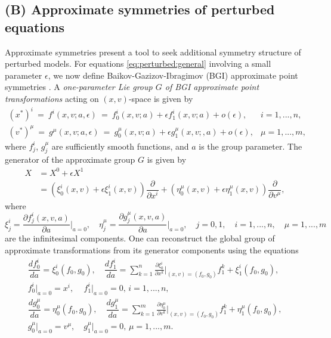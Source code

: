 \documentclass[11pt,letter,subeqn]{article}
\def\beq{\begin{equation}}
\def\eeq{\end{equation}}
\def\barr{\begin{array}{ll}}
\def\earr{\end{array}}
\begin{document}
\subsection*{\textbf{(B)} Approximate symmetries of perturbed equations}
Approximate symmetries present a tool to seek additional symmetry structure of perturbed models. For equations \eqref{eq:perturbed:general} involving a small parameter $\epsilon$, we now define Baikov-Gazizov-Ibragimov (BGI) approximate point symmetries \cite{ibragimov1995crc,ibragimov2009approximate}. A \textit{one-parameter Lie group $G$ of BGI approximate point transformations} acting on $(x,v)$-space is given by
\begin{equation}\label{approx}
\begin{array}{ll}
     {(x^*)}^{i} ~=~ f^i(x,v;a,\epsilon) ~=~ f_0^i(x,v;a)+\epsilon f_1^i(x,v;a) + o(\epsilon),&  i=1,...,n, \\[1ex]
     {(v^*)}^{\mu}~ =~g^\mu(x,v;a,\epsilon)~=~ g_0^\mu(x,v;a)+\epsilon g_1^\mu(x,v;,a) + o(\epsilon),&  \mu=1,...,m,
\earr
\end{equation}
where $f_j^i$, $g_j^\mu$ are sufficiently smooth functions, and $a$ is the group parameter. The generator of the approximate group $G$ is given by
\beq\label{X:X0:X1}
\barr
X &= X^0+\epsilon X^1 \\[2ex]
  &= \left(\xi_0^i(x,v)+\epsilon \xi_1^i(x,v)\right)\dfrac{\partial}{\partial x^i}+\left(\eta_0^\mu(x,v)+\epsilon \eta_1^\mu(x,v)\right)\dfrac{\partial}{\partial v^\mu},
\earr
\eeq
where
\[
\xi_j^i=\frac{\partial f_j^i(x,v,a) }{\partial a}\bigg|_{a=0},\quad \eta_j^\mu=\frac{\partial g_j^\mu(x,v,a) }{\partial a}\bigg|_{a=0},\quad  j=0,1,\quad i=1,...,n,\quad
\mu=1,...,m
\]
are the infinitesimal components. One can reconstruct the global group of approximate transformations from its generator components using the equations
\beq\label{eq:Lie:approx}
\barr
\dfrac{df_0^i}{da}= \xi_0^i(f_0,g_0), \quad \dfrac{df_1^i}{da}=\displaystyle \sum_{k=1}^{n}\frac{\partial \xi_0^i}{\partial x^k}\bigg|_{(x,v)=(f_0,g_0)}f_1^k + \xi_1^i(f_0,g_0),\\[3ex]
 f_0^i\big|_{a=0}=x^i,\,\quad  f_1^i\big |_{a=0}=0,\, i=1,...,n,\\[3ex]
\dfrac{dg_0^\mu}{da}= \eta_0^\mu(f_0,g_0),\quad  \dfrac{dg_1^\mu}{da}=\displaystyle \sum_{k=1}^{m}\frac{\partial \eta_0^\mu}{\partial v^k}\bigg|_{(x,v)=(f_0,g_0)}f_1^k +\eta_1^\mu(f_0,g_0),\\[3ex]
g_0^\mu\big|_{a=0}=v^\mu,\quad  g_1^\mu\big |_{a=0}=0,\, \mu=1,...,m.
\earr
\eeq
\end{document}
